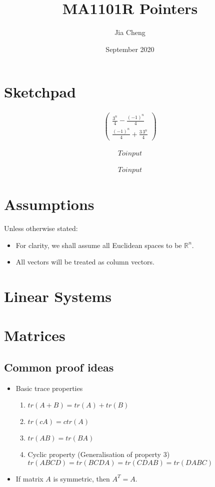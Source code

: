 \documentclass{article}
\title{MA1101R Pointers}
\author{Jia Cheng}
\date{September 2020}
\begin{document}
\maketitle

\section{Sketchpad}
\begin{align*}
    \left(\begin{array}{c} \frac{3^n}{4}-\frac{{\left(-1\right)}^n}{4}\\ \frac{{\left(-1\right)}^n}{4}+\frac{3\,3^n}{4} \end{array}\right)
\end{align*}

\begin{align*}
    To input
\end{align*}

\begin{align*}
    To input
\end{align*}

\section{Assumptions}
Unless otherwise stated:
\begin{itemize}
	\item For clarity, we shall assume all Euclidean spaces to be $\mathbb{R}^n$.
	\item All vectors will be treated as column vectors.
\end{itemize}


\section{Linear Systems}

\section{Matrices}
\subsection{Common proof ideas}
\begin{itemize}
	\item Basic trace properties
	\begin{enumerate}
		\item $tr(A + B) = tr(A) + tr(B)$
		\item $tr(cA) = ctr(A)$
		\item $tr(AB) = tr(BA)$
		\item Cyclic property (Generalisation of property 3)\\
		$tr(ABCD) = tr(BCDA) = tr(CDAB) = tr(DABC)$
	\end{enumerate}
	\item If matrix $A$ is symmetric, then $A^T=A$. 
\end{itemize}
\end{document}
